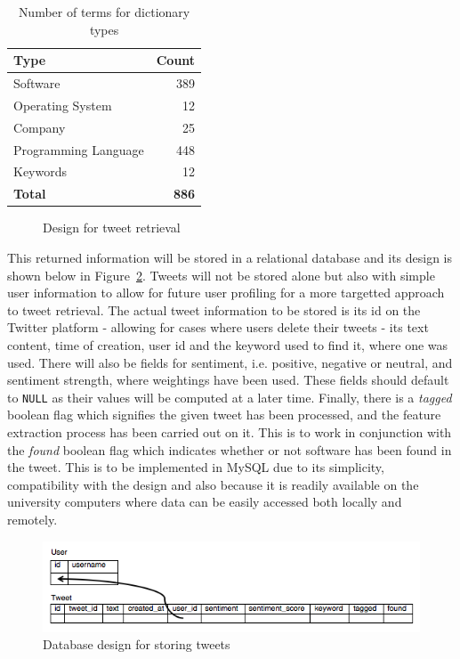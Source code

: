 \begin{table}[h]
\begin{center}
\begin{tabular}{|l|r|}\hline\hline
\textbf{Type}&\textbf{Count}\\\hline
Software&389\\
Operating System&12\\
Company&25\\
Programming Language&448\\
Keywords&12\\\hline
\textbf{Total}&\textbf{886}\\\hline\hline
\end{tabular}
\end{center}
\caption{Number of terms for dictionary types}
\label{tbl:dict_types}
\end{table}

\begin{figure}[h]
  \centering
  
  \caption{Design for tweet retrieval
    \label{fig:phase1}}
\end{figure}

This returned information will be stored in a relational database and its design is shown below in Figure~\ref{fig:db}. Tweets will not be stored alone but also with simple user information to allow for future user profiling for a more targetted approach to tweet retrieval. The actual tweet information to be stored is its id on the Twitter platform - allowing for cases where users delete their tweets - its text content, time of creation, user id and the keyword used to find it, where one was used. There will also be fields for sentiment, i.e. positive, negative or neutral, and sentiment strength, where weightings have been used. These fields should default to \texttt{NULL} as their values will be computed at a later time. Finally, there is a \emph{tagged} boolean flag which signifies the given tweet has been processed, and the feature extraction process has been carried out on it. This is to work in conjunction with the \emph{found} boolean flag which indicates whether or not software has been found in the tweet. This is to be implemented in MySQL due to its simplicity, compatibility with the design and also because it is readily available on the university computers where data can be easily accessed both locally and remotely.

\begin{figure}[h]
\begin{center}
\includegraphics[width=12cm]{db}
\end{center}
\caption{Database design for storing tweets}
\label{fig:db}
\end{figure}

